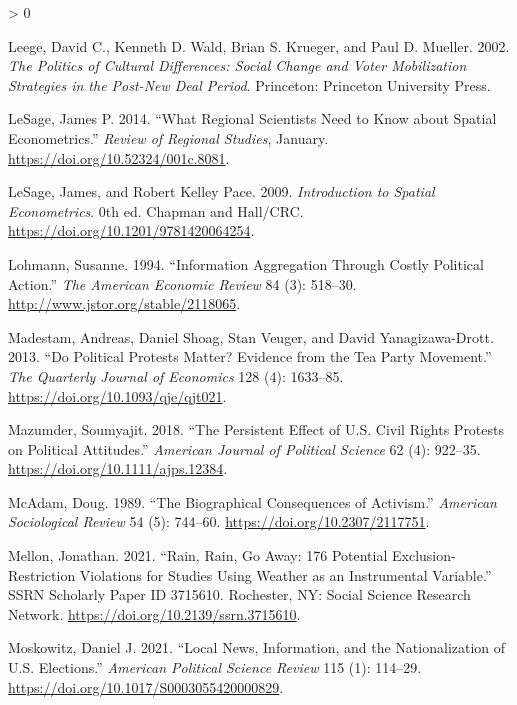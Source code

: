 \documentclass[
  12pt,
]{article}
\newlength{\cslhangindent}
\newenvironment{CSLReferences}[2] %
 {%
  \setlength{\parindent}{0pt}
  \ifodd #1 \everypar{\setlength{\hangindent}{\cslhangindent}}\ignorespaces\fi
  \ifnum #2 > 0
  \setlength{\parskip}{#2\baselineskip}
  \fi
 }%
 {}
\begin{document}
\begin{CSLReferences}{1}{0}
\leavevmode\hypertarget{ref-Leege2002}{}%
Leege, David C., Kenneth D. Wald, Brian S. Krueger, and Paul D. Mueller. 2002. \emph{The Politics of Cultural Differences: Social Change and Voter Mobilization Strategies in the Post-{New Deal} Period}. {Princeton}: {Princeton University Press}.

\leavevmode\hypertarget{ref-LeSage2014}{}%
LeSage, James P. 2014. {``What {Regional Scientists Need} to {Know} about {Spatial Econometrics}.''} \emph{Review of Regional Studies}, January. \url{https://doi.org/10.52324/001c.8081}.

\leavevmode\hypertarget{ref-LeSage2009}{}%
LeSage, James, and Robert Kelley Pace. 2009. \emph{Introduction to {Spatial Econometrics}}. 0th ed. {Chapman and Hall/CRC}. \url{https://doi.org/10.1201/9781420064254}.

\leavevmode\hypertarget{ref-Lohmann1994}{}%
Lohmann, Susanne. 1994. {``Information {Aggregation Through Costly Political Action}.''} \emph{The American Economic Review} 84 (3): 518--30. \url{http://www.jstor.org/stable/2118065}.

\leavevmode\hypertarget{ref-Madestam2013}{}%
Madestam, Andreas, Daniel Shoag, Stan Veuger, and David Yanagizawa-Drott. 2013. {``Do {Political Protests Matter}? {Evidence} from the {Tea Party Movement}.''} \emph{The Quarterly Journal of Economics} 128 (4): 1633--85. \url{https://doi.org/10.1093/qje/qjt021}.

\leavevmode\hypertarget{ref-Mazumder2018}{}%
Mazumder, Soumyajit. 2018. {``The {Persistent Effect} of {U}.{S}. {Civil Rights Protests} on {Political Attitudes}.''} \emph{American Journal of Political Science} 62 (4): 922--35. \url{https://doi.org/10.1111/ajps.12384}.

\leavevmode\hypertarget{ref-McAdam1989}{}%
McAdam, Doug. 1989. {``The {Biographical Consequences} of {Activism}.''} \emph{American Sociological Review} 54 (5): 744--60. \url{https://doi.org/10.2307/2117751}.

\leavevmode\hypertarget{ref-Mellon2021}{}%
Mellon, Jonathan. 2021. {``Rain, {Rain}, {Go Away}: 176 {Potential Exclusion}-{Restriction Violations} for {Studies Using Weather} as an {Instrumental Variable}.''} SSRN Scholarly Paper ID 3715610. {Rochester, NY}: {Social Science Research Network}. \url{https://doi.org/10.2139/ssrn.3715610}.

\leavevmode\hypertarget{ref-Moskowitz2021}{}%
Moskowitz, Daniel J. 2021. {``Local {News}, {Information}, and the {Nationalization} of {U}.{S}. {Elections}.''} \emph{American Political Science Review} 115 (1): 114--29. \url{https://doi.org/10.1017/S0003055420000829}.


\end{CSLReferences}
\end{document}
